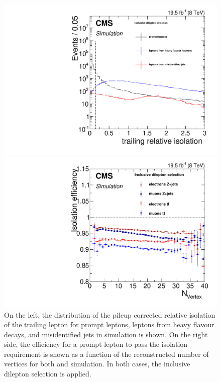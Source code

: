 \begin{figure}[htbp]
\centering
\begin{minipage}[t]{0.49\textwidth}
  \includegraphics[width=\textwidth]{plots/SELECTION/iso_Inclusive_Full2012_TrailingIso_None_MC.pdf}
\end{minipage}
\begin{minipage}[t]{0.49\textwidth}
\includegraphics[width=\textwidth]{plots/SELECTION/isoEff_Inclusive_Full2012_nVtx_None_MC.pdf}
\end{minipage}
\caption{On the left, the distribution of the pileup corrected relative isolation of the trailing lepton for prompt leptons, leptons from heavy flavour decays, and misidentified jets in \ttbar simulation is shown. On the right side, the efficiency for a prompt lepton to pass the isolation requirement is shown as a function of the reconstructed number of vertices for both \ttbar and \Zjets simulation. In both cases, the inclusive dilepton selection is applied.}
\label{fig:isolation}
\end{figure}   

